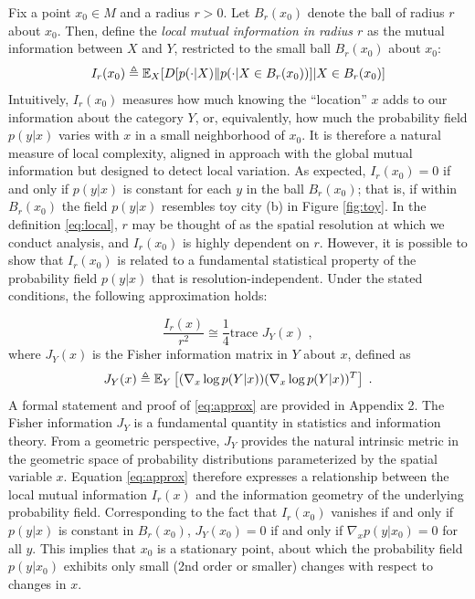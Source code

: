 	Fix a point $x_0 \in M$ and a radius $r > 0$. Let $B_r(x_0)$ denote the ball of radius $r$ about $x_0$. Then, define the \emph{local mutual information in radius $r$} as the mutual information between $X$ and $Y$, restricted to the small ball $B_r(x_0)$ about $x_0$:
	\begin{equation}
		I_r(x_0) \triangleq \mathbb{E}_X[D[p(\cdot|X)\| p(\cdot|X \in B_r(x_0))]|X \in B_r(x_0)] \label{eq:local}
	\end{equation}
	Intuitively, $I_r(x_0)$ measures how much knowing the ``location'' $x$ adds to our information about the category $Y$, or, equivalently, how much the probability field $p(y|x)$ varies with $x$ in a small neighborhood of $x_0$. It is therefore a natural measure of local complexity, aligned in approach with the global mutual information but designed to detect local variation. As expected, $I_r(x_0) = 0$ if and only if $p(y|x)$ is constant for each $y$ in the ball $B_r(x_0)$; that is, if within $B_r(x_0)$ the field $p(y|x)$ resembles toy city (b) in Figure \ref{fig:toy}. In the definition \eqref{eq:local}, $r$ may be thought of as the spatial resolution at which we conduct analysis, and $I_r(x_0)$ is highly dependent on $r$. However, it is possible to show that $I_r(x_0)$ is related to a fundamental statistical property of the probability field $p(y|x)$ that is resolution-independent. Under the stated conditions, the following approximation holds: 

	\begin{equation}
		\frac{I_r(x)}{r^2} \cong \frac{1}{4} \text{trace } J_Y(x)\;, \label{eq:approx}
	\end{equation}
	where $J_Y(x)$ is the Fisher information matrix in $Y$ about $x$, defined as 
	\begin{equation}
		J_Y(x) \triangleq \mathbb{E}_Y\left[ (\nabla_x \log p(Y|x))(\nabla_x \log p(Y|x))^T \right]\;.
	\end{equation}
	A formal statement and proof of \eqref{eq:approx} are provided in Appendix 2. The Fisher information $J_Y$ is a fundamental quantity in statistics and information theory. From a geometric perspective, $J_Y$ provides the natural intrinsic metric in the geometric space of probability distributions parameterized by the spatial variable $x$. Equation \eqref{eq:approx} therefore expresses a relationship between the local mutual information $I_r(x)$ and the information geometry of the underlying probability field. Corresponding to the fact that $I_r(x_0)$ vanishes if and only if $p(y|x)$ is constant in $B_r(x_0)$, $J_Y(x_0) = 0$ if and only if $\nabla_x p(y|x_0) = 0$ for all $y$. This implies that $x_0$ is a stationary point, about which the probability field $p(y|x_0)$ exhibits only small (2nd order or smaller) changes with respect to changes in $x$. 

